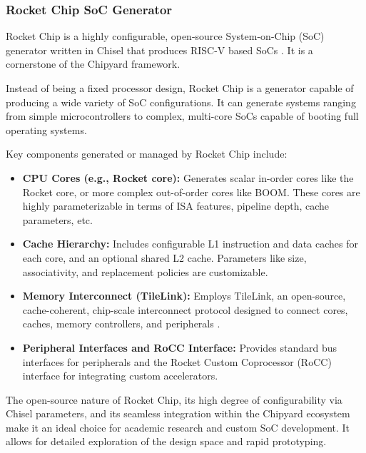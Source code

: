 \subsubsection{Rocket Chip SoC Generator}
Rocket Chip is a highly configurable, open-source System-on-Chip (SoC) generator written in Chisel that produces RISC-V based SoCs \cite{asanovic2016rocketchip}. It is a cornerstone of the Chipyard framework.

Instead of being a fixed processor design, Rocket Chip is a generator capable of producing a wide variety of SoC configurations. It can generate systems ranging from simple microcontrollers to complex, multi-core SoCs capable of booting full operating systems.

Key components generated or managed by Rocket Chip include:
\begin{itemize}
    \item \textbf{CPU Cores (e.g., Rocket core):} Generates scalar in-order cores like the Rocket core, or more complex out-of-order cores like BOOM. These cores are highly parameterizable in terms of ISA features, pipeline depth, cache parameters, etc.
    \item \textbf{Cache Hierarchy:} Includes configurable L1 instruction and data caches for each core, and an optional shared L2 cache. Parameters like size, associativity, and replacement policies are customizable.
    \item \textbf{Memory Interconnect (TileLink):} Employs TileLink, an open-source, cache-coherent, chip-scale interconnect protocol designed to connect cores, caches, memory controllers, and peripherals \cite[p.~6]{asanovic2016rocketchip} \cite[p.~15]{chipyard}.
    \item \textbf{Peripheral Interfaces and RoCC Interface:} Provides standard bus interfaces for peripherals and the Rocket Custom Coprocessor (RoCC) interface for integrating custom accelerators.
\end{itemize}

The open-source nature of Rocket Chip, its high degree of configurability via Chisel parameters, and its seamless integration within the Chipyard ecosystem make it an ideal choice for academic research and custom SoC development. It allows for detailed exploration of the design space and rapid prototyping.


